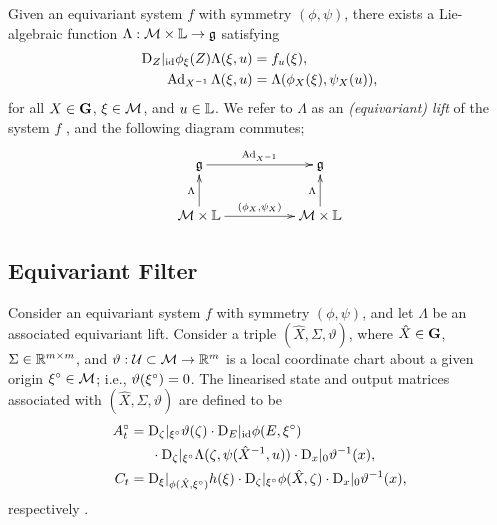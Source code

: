 \documentclass{article}
\begin{document}
Given an equivariant system $f$ with symmetry $(\phi, \psi)$, there exists a Lie-algebraic function $\Lambda : \mathcal{M} \times \mathbb{L} \to \mathfrak{g}$ satisfying
\begin{align}
    \mathrm{D}_{Z} |_{\mathrm{id}} \phi_\xi(Z) \Lambda(\xi, u) &= f_u(\xi), \\
    \operatorname{Ad}_{X^{-1}} \Lambda(\xi, u) &= \Lambda(\phi_X(\xi), \psi_X(u)),
\end{align}
for all $X \in \mathbf{G}$, $\xi \in \mathcal{M}$, and $u \in \mathbb{L}$.
We refer to $\Lambda$ as an \emph{(equivariant) lift} of the system $f$ \citep{mahony2020equivariant}, and the following diagram commutes;
\[
\xymatrixcolsep{50pt}
\xymatrix{
\gothg
\ar[r]^{\Ad_{X^{-1}}}
&
\gothg
\\
\calM \times \vecL
\ar[u]^{\Lambda}
\ar[r]^{(\phi_X, \psi_X)}
&
\ar[u]^{\Lambda}
\calM \times \vecL
}
\]

\subsection{Equivariant Filter}

Consider an equivariant system $f$ with symmetry $(\phi, \psi)$, and let $\Lambda$ be an associated equivariant lift.
Consider a triple $(\hat{X}, \Sigma, \vartheta)$, where $\hat{X} \in \mathbf{G}$, $\Sigma \in \mathbb{R}^{m \times m}$, and $\vartheta : \mathcal{U} \subset \mathcal{M} \to \mathbb{R}^m$ is a local coordinate chart about a given origin ${\xi}^\circ \in \mathcal{M}$; i.e., $\vartheta({\xi}^\circ) = 0$.
The linearised state and output matrices associated with $(\hat{X}, \Sigma, \vartheta)$ are defined to be
\begin{align}
    {A}^\circ_t
    &= \mathrm{D}_{\zeta}|_{{\xi}^\circ} \vartheta(\zeta) \cdot \mathrm{D}_E |_{\mathrm{id}} \phi(E, {\xi}^\circ)
    \notag \\ &\phantom{==}
     \cdot \mathrm{D}_\zeta |_{{\xi}^\circ} \Lambda(\zeta, \psi(\hat{X}^{-1}, u)) \cdot \mathrm{D}_x |_0 \vartheta^{-1} (x), \\
    C_t
    &= \mathrm{D}_\xi |_{\phi(\hat{X}, {\xi}^\circ)} h(\xi) \cdot \mathrm{D}_{\zeta}|_{{\xi}^\circ} \phi(\hat{X}, \zeta) \cdot \mathrm{D}_x |_0 \vartheta^{-1} (x),
\end{align}
respectively \citep{van2020equivariant}.
\end{document}
